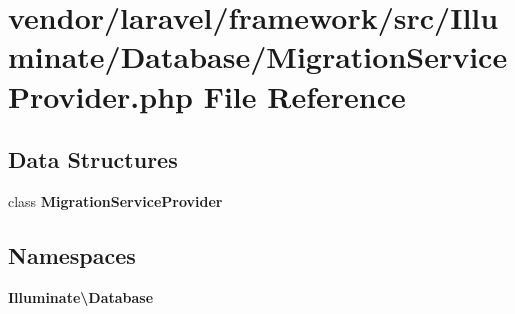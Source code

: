 \section{vendor/laravel/framework/src/\+Illuminate/\+Database/\+Migration\+Service\+Provider.php File Reference}
\label{_migration_service_provider_8php}
\subsection*{Data Structures}
\begin{DoxyCompactItemize}
\item 
class {\bf Migration\+Service\+Provider}
\end{DoxyCompactItemize}
\subsection*{Namespaces}
\begin{DoxyCompactItemize}
\item 
 {\bf Illuminate\textbackslash{}\+Database}
\end{DoxyCompactItemize}
